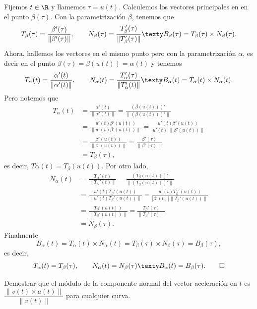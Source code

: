 \documentclass[a4,11pt]{aleph-examen}
\begin{document}
\begin{preguntas}
\begin{respuesta}
    Fijemos $t\in \R$ y llamemos $\tau=u(t)$. Calculemos los vectores principales en en el punto $\beta(\tau)$. Con la parametrización $\beta$, tenemos que
    \[
        T_\beta(\tau)= \frac{\beta'(\tau)}{\|\beta'(\tau)\|},
        \qquad
        N_\beta(\tau)= \frac{T_\beta'(\tau)}{\|T_\beta'(\tau)\|}
        \texty
        B_\beta(\tau)= T_\beta(\tau)\times N_\beta(\tau).
    \]
    Ahora, hallemos los vectores en el mismo punto pero con la parametrización $\alpha$, es decir en el punto $\beta(\tau)=\beta(u(t))=\alpha(t)$ y tenemos
    \[
        T_\alpha(t)= \frac{\alpha'(t)}{\|\alpha'(t)\|},
        \qquad
        N_\alpha(t)= \frac{T_\alpha'(\tau)}{\|T_\alpha'(t)\|}
        \texty
        B_\alpha(t)= T_\alpha(t)\times N_\alpha(t).
    \]
    Pero notemos que
    \begin{align*}
        T_\alpha(t)
            & = \frac{\alpha'(t)}{\|\alpha'(t)\|} = \frac{(\beta(u(t)))'}{\|(\beta(u(t)))'\|}\\[1mm]
            & = \frac{u'(t)\beta'(u(t))}{\|u'(t)\beta'(u(t))\|} = \frac{u'(t)\beta'(u(t))}{|u'(t)|\|\beta'(u(t))\|}\\[1mm]
            & = \frac{\beta'(u(t))}{\|\beta'(u(t))\|} = \frac{\beta'(\tau)}{\|\beta'(\tau)\|}\\[1mm]
            & = T_\beta(\tau),
    \end{align*}
    es decir, $T\alpha(t)=T_\beta(u(t))$. Por otro lado, 
    \begin{align*}
        N_\alpha(t)
            & = \frac{T_\alpha'(t)}{\|T_\alpha'(t)\|} = \frac{(T_\beta(u(t)))'}{\|(T_\beta(u(t)))'\|}\\[1mm]
            & = \frac{u'(t)T_\beta'(u(t))}{\|u'(t)T_\beta'(u(t))\|} = \frac{u'(t)T_\beta'(u(t))}{|\beta'(t)|\|T_\beta'(u(t))\|}\\[1mm]
            & = \frac{T_\beta'(u(t))}{\|T_\beta'(u(t))\|} = \frac{T_\beta'(\tau)}{\|T_\beta'(\tau)\|}\\[1mm]
            &= N_\beta(\tau).
    \end{align*}
    Finalmente
    \[
        B_\alpha(t)= T_\alpha(t)\times N_\alpha(t) 
        = T_\beta(\tau)\times N_\beta(\tau)=B_\beta(\tau),
    \]
    es decir,
    \[
        T_\alpha(t)= T_\beta(\tau),
        \qquad
        N_\alpha(t)= N_\beta(\tau)
        \texty
        B_\alpha(t)= B_\beta(\tau).\qedhere
    \]
\end{respuesta}

\item 
    Demostrar que el módulo de la componente normal del vector aceleración en $t$ es $\dfrac{\|v(t) \times a(t)\|}{\|v(t)\|}$ para cualquier curva.


\end{preguntas}
\end{document}
